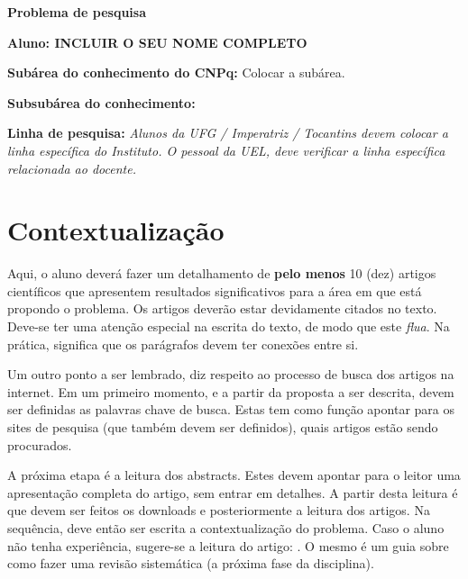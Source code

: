 \documentclass[a4paper,11pt]{article}
\begin{document}
\selectfont



\begin{framed}
\begin{center}
\textbf{\Large{Problema de pesquisa}}

\textbf{Aluno: INCLUIR O SEU NOME COMPLETO}
\end{center}

\textbf{Subárea do conhecimento do CNPq:} Colocar a subárea.

\textbf{Subsubárea do conhecimento:} 

\textbf{Linha de pesquisa:} \emph{Alunos da UFG / Imperatriz / Tocantins devem colocar a linha específica do Instituto. O pessoal da UEL, deve verificar a linha específica relacionada ao docente.}

\end{framed}

\section{Contextualização}
Aqui, o aluno deverá fazer um detalhamento de \textbf{pelo menos} 10 (dez) artigos científicos que apresentem resultados significativos para a área em que está propondo o problema. Os artigos deverão estar devidamente citados no texto. Deve-se ter uma atenção especial na escrita do texto, de modo que este \emph{flua}. Na prática, significa que os parágrafos devem ter conexões entre si. 

Um outro ponto a ser lembrado, diz respeito ao processo de busca dos artigos na internet. Em um primeiro momento, e a partir da proposta a ser descrita, devem ser definidas as palavras chave de busca. Estas tem como função apontar para os sites de pesquisa (que também devem ser definidos), quais artigos estão sendo procurados.  

A próxima etapa é a leitura dos abstracts. Estes devem apontar para o leitor uma apresentação completa do artigo, sem entrar em detalhes. A partir desta leitura é que devem ser feitos os downloads e posteriormente a leitura dos artigos. Na sequência, deve então ser escrita a contextualização do problema. Caso o aluno não tenha experiência, sugere-se a leitura do artigo: \cite{kitchenham2009systematic}. O mesmo é um guia sobre como fazer uma revisão sistemática (a próxima fase da disciplina).
\end{document}
